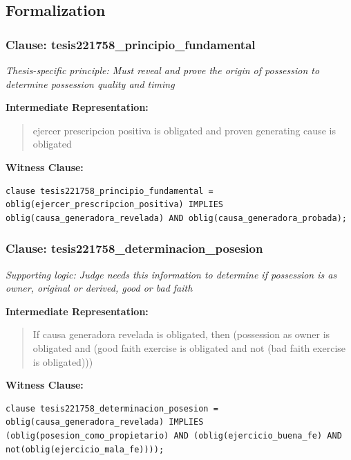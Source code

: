 \documentclass[11pt,a4paper]{article}
\begin{document}
\subsection{Formalization}

\subsubsection{Clause: tesis221758\_principio\_fundamental}

\textit{Thesis-specific principle: Must reveal and prove the origin of possession to determine possession quality and timing}

\textbf{Intermediate Representation:}

\begin{quote}
ejercer prescripcion positiva is obligated and proven generating cause is obligated
\end{quote}

\textbf{Witness Clause:}

\begin{lstlisting}[style=witnessstyle, language=Witness]
clause tesis221758_principio_fundamental = oblig(ejercer_prescripcion_positiva) IMPLIES oblig(causa_generadora_revelada) AND oblig(causa_generadora_probada);
\end{lstlisting}

\subsubsection{Clause: tesis221758\_determinacion\_posesion}

\textit{Supporting logic: Judge needs this information to determine if possession is as owner, original or derived, good or bad faith}

\textbf{Intermediate Representation:}

\begin{quote}
If causa generadora revelada is obligated, then (possession as owner is obligated and (good faith exercise is obligated and not (bad faith exercise is obligated)))
\end{quote}

\textbf{Witness Clause:}

\begin{lstlisting}[style=witnessstyle, language=Witness]
clause tesis221758_determinacion_posesion = oblig(causa_generadora_revelada) IMPLIES (oblig(posesion_como_propietario) AND (oblig(ejercicio_buena_fe) AND not(oblig(ejercicio_mala_fe))));
\end{lstlisting}
\end{document}
